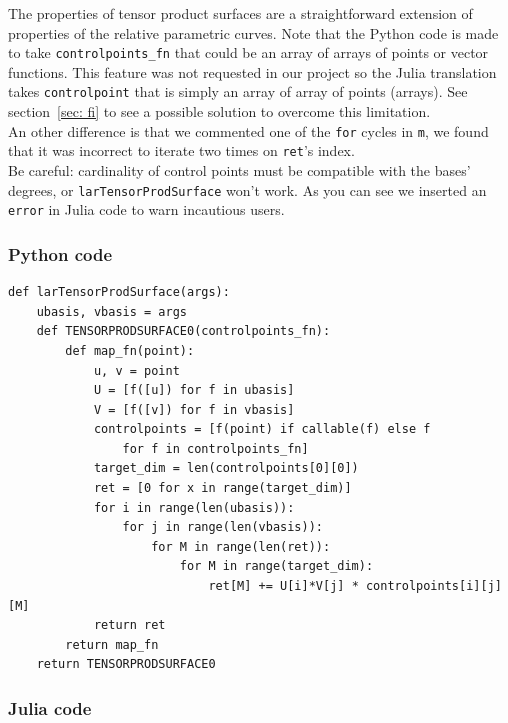 \documentclass[a4paper,11pt]{article}
\begin{document}
The properties of tensor product surfaces are a straightforward extension of properties of the relative parametric curves.
Note that the Python code is made to take \texttt{controlpoints\_fn} that could be an array of arrays of points or vector functions. This feature was not requested in our project so the Julia translation takes \texttt{controlpoint} that is simply an array of array of points (arrays). See section~\ref{sec: fi} to see a possible solution to overcome this limitation. \\
An other difference is that we commented one of the \texttt{for} cycles in \texttt{m}, we found that it was incorrect to iterate two times on \texttt{ret}'s index. \\
Be careful: cardinality of control points must be compatible with the bases' degrees, or \texttt{larTensorProdSurface} won't work. As you can see we inserted an \texttt{error} in Julia code to warn incautious users.


\subsubsection{Python code}

\begin{verbatim}
def larTensorProdSurface(args):
    ubasis, vbasis = args
    def TENSORPRODSURFACE0(controlpoints_fn):
        def map_fn(point):
            u, v = point
            U = [f([u]) for f in ubasis]
            V = [f([v]) for f in vbasis]
            controlpoints = [f(point) if callable(f) else f 
                for f in controlpoints_fn]
            target_dim = len(controlpoints[0][0])
            ret = [0 for x in range(target_dim)]
            for i in range(len(ubasis)):
                for j in range(len(vbasis)):
                    for M in range(len(ret)):
                        for M in range(target_dim):
                            ret[M] += U[i]*V[j] * controlpoints[i][j][M]
            return ret
        return map_fn
    return TENSORPRODSURFACE0
\end{verbatim}

\subsubsection{Julia code}
   
\end{document}
